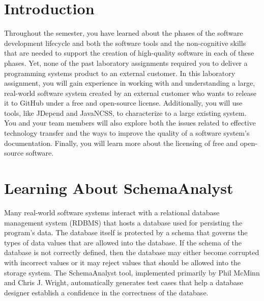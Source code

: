 

\usepackage[compact]{titlesec}

\usepackage[url=false,
    backend=biber,
    style=authoryear,
    doi=false,
    isbn=false,
    backref=false,
    dashed=false,                                   %
    maxnames=99,                                    %
    sorting=ydnt]{biblatex}                         %





\vspace*{-.1in}
\section*{Introduction}

\nocite{*}

Throughout the semester, you have learned about the phases of the software development lifecycle and both the software
tools and the non-cognitive skills that are needed to support the creation of high-quality software in each of these
phases. Yet, none of the past laboratory assignments required you to deliver a programming systems product to an
external customer. In this laboratory assignment, you will gain experience in working with and understanding a large,
real-world software system created by an external customer who wants to release it to GitHub under a free and
open-source license. Additionally, you will use tools, like JDepend and JavaNCSS, to characterize to a large existing
system. You and your team members will also explore both the issues related to effective technology transfer and the
ways to improve the quality of a software system's documentation. Finally, you will learn more about the licensing of
free and open-source software.

\vspace*{-.05in}
\section*{Learning About SchemaAnalyst}

Many real-world software systems interact with a relational database management system (RDBMS) that hosts a database
used for persisting the program's data. The database itself is protected by a schema that governs the types of data
values that are allowed into the database. If the schema of the database is not correctly defined, then the database may
either become corrupted with incorrect values or it may reject values that should be allowed into the storage system.
The SchemaAnalyst tool, implemented primarily by Phil McMinn and Chris J. Wright, automatically generates test cases
that help a database designer establish a confidence in the correctness of the database.

